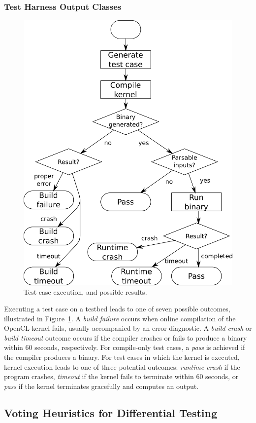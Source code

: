 \subsubsection{Test Harness Output Classes}
\begin{figure}
  \centering %
  \includegraphics[width=.7\columnwidth]{img/testprocess-long}
  \caption{%
  Test case execution, and possible results.%
  }%
  \label{fig:test-process}
\end{figure}
Executing a test case on a testbed leads to one of seven possible outcomes,
illustrated in Figure~\ref{fig:test-process}. A \emph{build failure} occurs when
online compilation of the OpenCL kernel fails, usually accompanied by an error
diagnostic. A \emph{build crash} or \emph{build timeout} outcome occurs if the
compiler crashes or fails to produce a binary within 60 seconds, respectively.
For compile-only test cases, a \emph{pass} is achieved if the compiler produces
a binary. For test cases in which the kernel is executed, kernel execution leads
to one of three potential outcomes: \emph{runtime crash} if the program crashes,
\emph{timeout} if the kernel fails to terminate within 60 seconds, or
\emph{pass} if the kernel terminates gracefully and computes an output.

\subsection{Voting Heuristics for Differential Testing}

